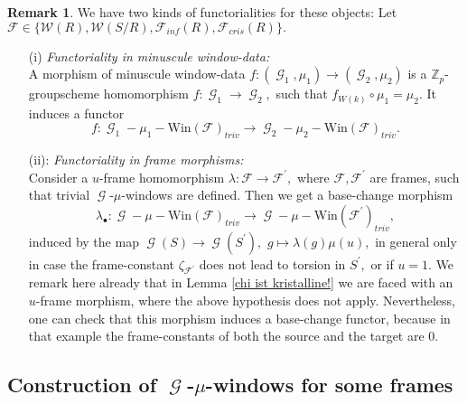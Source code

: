 \documentclass[a4paper,10,5 pt]{amsart}
\theoremstyle{definition}
\newtheorem{Remark}{Remark}
\DeclareMathOperator{\G}{\mathcal{G}}
\begin{document}
\begin{Remark}
We have two kinds of functorialities for these objects: Let $\mathcal{F}\in \lbrace \mathcal{W}(R),\mathcal{W}(S/R),\mathcal{F}_{inf}(R),\mathcal{F}_{cris}(R) \rbrace.$ 
\begin{enumerate}
\item[(i)]\textit{Functoriality in minuscule window-data:}
\\
A morphism of minuscule window-data $f\colon (\G_{1},\mu_{1})\rightarrow (\G_{2},\mu_{2})$ is a $\mathbb{Z}_{p}$-groupscheme homomorphism $f\colon \G_{1}\rightarrow \G_{2},$ such that $f_{W(k)}\circ \mu_{1}=\mu_{2}.$ It induces a functor
$$f\colon \G_{1}-\mu_{1}-\text{Win}(\mathcal{F})_{triv}\rightarrow \G_{2}-\mu_{2}-\text{Win}(\mathcal{F})_{triv}.$$
\item[(ii):]\textit{Functoriality in frame morphisms:}
\\
Consider a $u$-frame homomorphism
$\lambda\colon \mathcal{F}\rightarrow \mathcal{F}^{\prime},$ where $\mathcal{F},\mathcal{F}^{\prime}$ are frames, such that trivial $\G$-$\mu$-windows are defined. Then we get a base-change morphism
$$
\lambda_{\bullet}\colon \G-\mu-\text{Win}(\mathcal{F})_{triv} \rightarrow \G-\mu-\text{Win}(\mathcal{F}^{\prime})_{triv},
$$
induced by the map $\G(S)\rightarrow \G(S^{\prime}),$ $g\mapsto \lambda(g)\mu(u),$
in general only in case the frame-constant $\zeta_{\mathcal{F}^{\prime}}$ does not lead to torsion in $S^{\prime},$ or if $u=1.$ We remark here already that in Lemma \ref{chi ist kristalline!} we are faced with an $u$-frame morphism, where the above hypothesis does not apply. Nevertheless, one can check that this morphism induces a base-change functor, because in that example the frame-constants of both the source and the target are $0.$ 
\end{enumerate}
\end{Remark}
\subsection{Construction of $\G$-$\mu$-windows for some frames}
\end{document}
